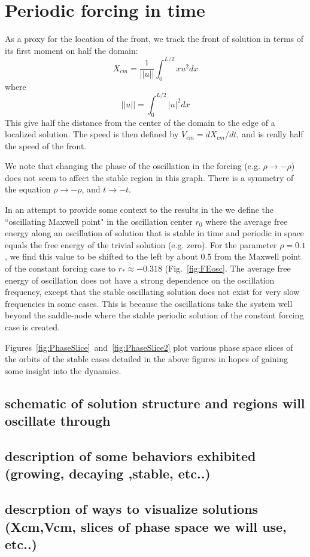 \documentclass[../main/TimeForcingSHE.tex]{subfiles}
\begin{document}
\section{Periodic forcing in time }
As a proxy for the location of the front, we track the front of solution in terms of its first moment on half the domain:
\begin{equation}
X_{cm}=\frac{1}{||u||} \int_{0}^{L/2}  x u^2 dx
\end{equation}
where 
\begin{equation}
||u||= \int_{0}^{L/2}  |u|^2 dx
\end{equation}
This give half the distance from the center of the domain to the edge of a localized solution. The speed is then defined by $V_{cm} = d X_{cm}/dt$, and is really half the speed of the front.

We note that changing the phase of the oscillation in the forcing (e.g. $\rho\rightarrow-\rho$) does not seem to affect the stable region in this graph. There is a symmetry of the equation $\rho\rightarrow -\rho$, and $t \rightarrow -t$.  


In an attempt to provide some context to the results in the we define the ``oscillating Maxwell point" in the oscillation center $r_0$ where the average free energy along an oscillation of solution that is stable in time and  periodic in space equals the free energy of the trivial solution (e.g. zero).  For the parameter $\rho=0.1$, we find this value to be shifted to the left by about 0.5 from the Maxwell point of the constant forcing case to $r_*\approx -0.318$ (Fig.~\ref{fig:FEosc}.  The average free energy of oscillation does not have a strong dependence on the oscillation frequency, except that the stable oscillating solution does not exist for very slow frequencies in some cases.  This is because the oscillations take the system well beyond the saddle-node where the stable periodic solution of the constant forcing case is created.   

Figures~\ref{fig:PhaseSlice}~and~\ref{fig:PhaseSlice2}  plot various phase space slices of the orbits of the stable cases detailed in the above figures in hopes of gaining some insight into the dynamics.

\FIGphaseslice
\FIGphasesliceTWO

\subsection{schematic of solution structure and regions will oscillate through}
\subsection{description of some behaviors exhibited (growing, decaying ,stable, etc..)}
\subsection{descrption of ways to visualize solutions (Xcm,Vcm, slices of phase space we will use, etc..)}
\end{document}
